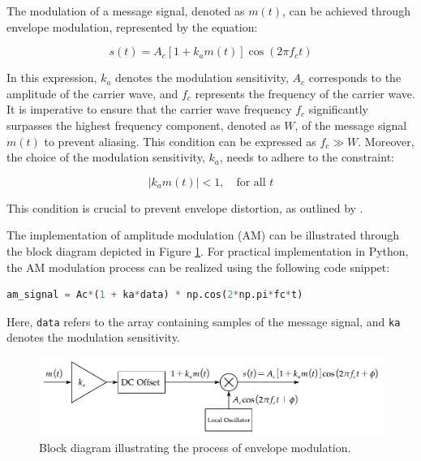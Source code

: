 \documentclass[../ECE459FinalProjectReport.tex]{subfiles}
\begin{document}
The modulation of a message signal, denoted as $m(t)$, can be achieved through envelope modulation, represented by the equation:

\begin{equation}
    s(t) = A_c [1 + k_a m(t)] \cos (2\pi f_c t)
\end{equation}

In this expression, $k_a$ denotes the modulation sensitivity, $A_c$ corresponds to the amplitude of the carrier wave, and $f_c$ represents the frequency of the carrier wave. It is imperative to ensure that the carrier wave frequency $f_c$ significantly surpasses the highest frequency component, denoted as $W$, of the message signal $m(t)$ to prevent aliasing. This condition can be expressed as $f_c \gg W$. Moreover, the choice of the modulation sensitivity, $k_a$, needs to adhere to the constraint:

\begin{equation}
    \left| k_a m(t) \right| < 1, \quad \text{for all }t
\end{equation}

This condition is crucial to prevent envelope distortion, as outlined by \textcite[pp. 101-102]{haykinIntroductionAnalogDigital2007}.

The implementation of amplitude modulation (AM) can be illustrated through the block diagram depicted in Figure \ref{fig:env-mod}. For practical implementation in Python, the AM modulation process can be realized using the following code snippet:

\begin{lstlisting}[language=python]
am_signal = Ac*(1 + ka*data) * np.cos(2*np.pi*fc*t)
\end{lstlisting}

Here, \verb|data| refers to the array containing samples of the message signal, and \verb|ka| denotes the modulation sensitivity.

\begin{figure}[b]
    \centering
    \includegraphics[scale=0.7]{plots/env_mod.pdf}
    \caption{Block diagram illustrating the process of envelope modulation.}
    \label{fig:env-mod}
\end{figure}
\end{document}
